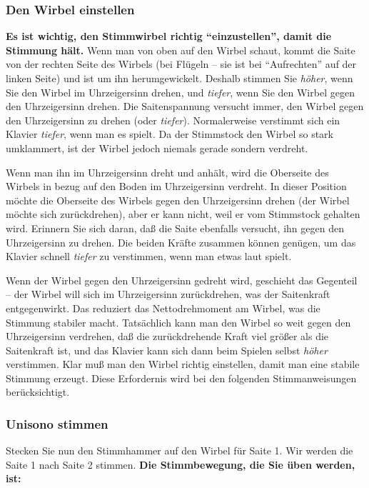 \label{c2_5c}
\subsubsection{Den Wirbel einstellen}
\label{c2_5_wirb} 

\textbf{Es ist wichtig, den Stimmwirbel richtig \enquote{einzustellen}, damit die Stimmung hält.}
Wenn man von oben auf den Wirbel schaut, kommt die Saite von der rechten Seite des Wirbels (bei Flügeln -- sie ist bei \enquote{Aufrechten} auf der linken Seite) und ist um ihn herumgewickelt.
Deshalb stimmen Sie \textit{höher}, wenn Sie den Wirbel im Uhrzeigersinn drehen, und \textit{tiefer}, wenn Sie den Wirbel gegen den Uhrzeigersinn drehen.
Die Saitenspannung versucht immer, den Wirbel gegen den Uhrzeigersinn zu drehen (oder \textit{tiefer}).
Normalerweise verstimmt sich ein Klavier \textit{tiefer}, wenn man es spielt.
Da der Stimmstock den Wirbel so stark umklammert, ist der Wirbel jedoch niemals gerade sondern verdreht.

Wenn man ihn im Uhrzeigersinn dreht und anhält, wird die Oberseite des Wirbels in bezug auf den Boden im Uhrzeigersinn verdreht.
In dieser Position möchte die Oberseite des Wirbels gegen den Uhrzeigersinn drehen (der Wirbel möchte sich zurückdrehen), aber er kann nicht, weil er vom Stimmstock gehalten wird.
Erinnern Sie sich daran, daß die Saite ebenfalls versucht, ihn gegen den Uhrzeigersinn zu drehen.
Die beiden Kräfte zusammen können genügen, um das Klavier schnell \textit{tiefer} zu verstimmen, wenn man etwas laut spielt.

Wenn der Wirbel gegen den Uhrzeigersinn gedreht wird, geschieht das Gegenteil -- der Wirbel will sich im Uhrzeigersinn zurückdrehen, was der Saitenkraft entgegenwirkt.
Das reduziert das Nettodrehmoment am Wirbel, was die Stimmung stabiler macht.
Tatsächlich kann man den Wirbel so weit gegen den Uhrzeigersinn verdrehen, daß die zurückdrehende Kraft viel größer als die Saitenkraft ist, und das Klavier kann sich dann beim Spielen selbst \textit{höher} verstimmen.
Klar muß man den Wirbel richtig einstellen, damit man eine stabile Stimmung erzeugt.
Diese Erfordernis wird bei den folgenden Stimmanweisungen berücksichtigt.
 

\label{c2_5d}
\subsubsection{Unisono stimmen}
\label{c2_5_unis}

Stecken Sie nun den Stimmhammer auf den Wirbel für Saite 1.
Wir werden die Saite 1 nach Saite 2 stimmen.
\textbf{Die Stimmbewegung, die Sie üben werden, ist:}

